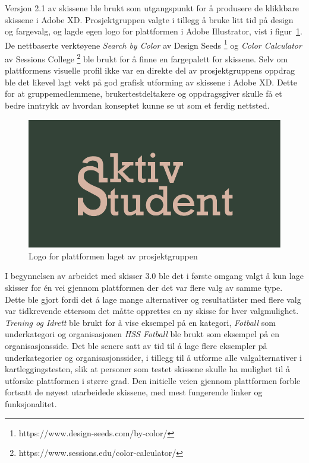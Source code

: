 Versjon 2.1 av skissene ble brukt som utgangspunkt for å produsere de klikkbare skissene i Adobe XD. Prosjektgruppen valgte i tillegg å bruke litt tid på design og fargevalg, og lagde egen logo for plattformen i Adobe Illustrator, vist i figur~\ref{fig:aktivStudentLogo}. De nettbaserte verktøyene {\em Search by Color} av Design Seeds \footnote{https://www.design-seeds.com/by-color/} og {\em Color Calculator} av Sessions College \footnote{https://www.sessions.edu/color-calculator/} ble brukt for å finne en fargepalett for skissene. Selv om plattformens visuelle profil ikke var en direkte del av prosjektgruppens oppdrag ble det likevel lagt vekt på god grafisk utforming av skissene i Adobe XD. Dette for at gruppemedlemmene, brukertestdeltakere og oppdragsgiver skulle få et bedre inntrykk av hvordan konseptet kunne se ut som et ferdig nettsted.

\begin{figure}[H]
\centering
\includegraphics[width=.7\textwidth]{Illustrasjoner/aktivstudentlogo.png}
\caption{Logo for plattformen laget av prosjektgruppen}
\label{fig:aktivStudentLogo}
\end{figure}

I begynnelsen av arbeidet med skisser 3.0 ble det i første omgang valgt å kun lage skisser for én vei gjennom plattformen der det var flere valg av samme type. Dette ble gjort fordi det å lage mange alternativer og resultatlister med flere valg var tidkrevende ettersom det måtte opprettes en ny skisse for hver valgmulighet. {\em Trening og Idrett} ble brukt for å vise eksempel på en kategori, {\em Fotball} som underkategori og organisasjonen {\em HSS Fotball} ble brukt som eksempel på en organisasjonsside. Det ble senere satt av tid til å lage flere eksempler på underkategorier og organisasjonssider, i tillegg til å utforme alle valgalternativer i kartleggingstesten, slik at personer som testet skissene skulle ha mulighet til å utforske plattformen i større grad. Den initielle veien gjennom plattformen forble fortsatt de nøyest utarbeidede skissene, med mest fungerende linker og funksjonalitet.

